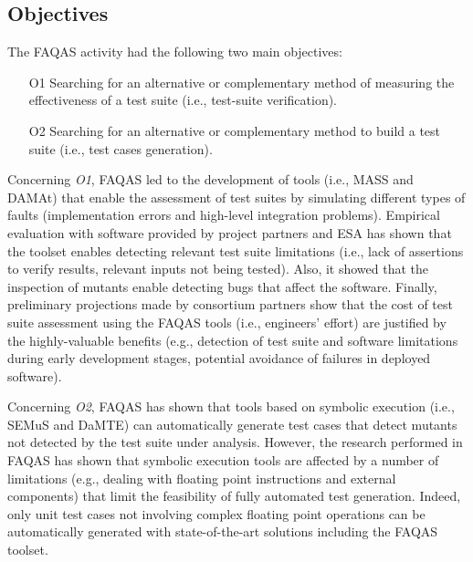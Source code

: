 
\STARTCHANGEDWPT

\subsection{Objectives}

The FAQAS activity had the following two main objectives:
\begin{itemize}
\item[O1] Searching for an alternative or complementary method of measuring the effectiveness of a test suite (i.e., test-suite verification).
\item[O2] Searching for an alternative or complementary method to build a test suite (i.e., test cases generation).
\end{itemize}

Concerning \emph{O1}, FAQAS led to the development of tools (i.e., MASS and DAMAt) that enable the assessment of test suites by simulating different types of faults (implementation errors and high-level integration problems). Empirical evaluation with software provided by project partners and ESA has shown that the toolset enables detecting relevant test suite limitations (i.e., lack of assertions to verify results, relevant inputs not being tested). Also, it showed that the inspection of mutants enable detecting bugs that affect the software. Finally, preliminary projections made by consortium partners show that the cost of test suite assessment using the FAQAS tools (i.e., engineers' effort) are justified by the highly-valuable benefits (e.g., detection of test suite and software limitations during early development stages, potential avoidance of failures in deployed software).

Concerning \emph{O2}, FAQAS has shown that tools based on symbolic execution (i.e., SEMuS and DaMTE) can automatically generate test cases that detect mutants not detected by the test suite under analysis. However, the research performed in FAQAS has shown that 
symbolic execution tools
are affected by a number of limitations (e.g., dealing with floating point instructions and external components) that limit the feasibility of fully automated test generation. Indeed, only unit test cases not involving complex floating point operations can be automatically generated with state-of-the-art solutions including the FAQAS toolset.

